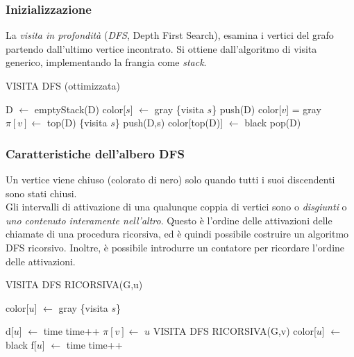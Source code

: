 \documentclass[11pt]{book}
\begin{document}
\subsubsection{Inizializzazione}
La \textit{visita in profondità} (\textit{DFS}, Depth First Search), esamina i vertici del grafo partendo dall'ultimo 
vertice incontrato. Si ottiene dall'algoritmo di visita generico, implementando la frangia come \textit{stack}.
\begin{algorithm}
    \caption{VISITA DFS (ottimizzata)}
    \begin{algorithmic}
        \State D $\gets$ emptyStack(D)
        \State color[$s$] $\gets$ gray
        \State \{visita $s$\}
        \State push(D)
                \State color[$v$] = gray 
                \State $\pi[v] \gets$ top(D) 
                \State \{visita $s$\}
                \State push(D,s)
            \EndIf 
            \EndWhile
            \State color[top(D)] $\gets$ black
            \State pop(D)
        \EndWhile
    \end{algorithmic}
\end{algorithm}
\subsubsection{Caratteristiche dell'albero DFS}
Un vertice viene chiuso (colorato di nero) solo quando tutti i suoi discendenti sono stati chiusi.\\
Gli intervalli di attivazione di una qualunque coppia di vertici sono o \textit{disgiunti} o \textit{uno contenuto interamente 
nell'altro}. Questo è l'ordine delle attivazioni delle chiamate di una procedura ricorsiva, ed è quindi possibile costruire 
un algoritmo DFS ricorsivo. Inoltre, è possibile introdurre un contatore per ricordare l'ordine delle attivazioni.
\begin{algorithm}[H]
    \caption{VISITA DFS RICORSIVA(G,u)}
    \begin{algorithmic}
        \State color[$u$] $\gets$ gray
        \State \{visita $s$\}
    \end{algorithmic}
\end{algorithm}
\begin{algorithm}[H]
    \begin{algorithmic}
        \State d[$u$] $\gets$ time
        \State time++
                \State $\pi[v] \gets$ $u$
                \State VISITA DFS RICORSIVA(G,v)
            \EndIf 
            \State color[$u$] $\gets$ black
            \State f[$u$] $\gets$ time
            \State time++
        \EndFor
    \end{algorithmic}
\end{algorithm}
\end{document}
